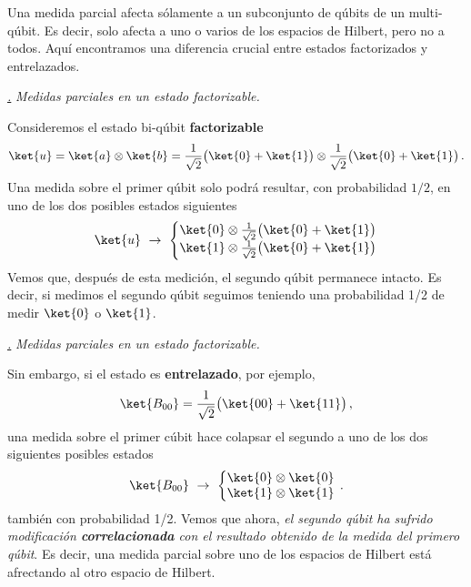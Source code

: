 \documentclass[a4paper,11pt]{book} %
\numberwithin{equation}{chapter}
\def\subsubiContadorIt{\par\addtocounter{subsubsection}{1}\underline{\it\thesubsubsection.}\hskip0.5cm \setcounter{subsubsubsectionIt}{0}}
\newcommand{\SubsubiIt}[1]{
		\subsubiContadorIt \textit{#1}
	}
\newcounter{subsubsubsectionIt}[subsubsection]
\begin{document}
Una medida parcial afecta sólamente a un subconjunto de qúbits de un multi-qúbit. Es decir, solo afecta a uno o varios de los espacios de Hilbert, pero no a todos. Aquí encontramos una diferencia crucial entre estados factorizados y entrelazados. 		
		
			\SubsubiIt{Medidas parciales en un estado factorizable.}
			 


Consideremos el estado bi-qúbit \textbf{factorizable} 
\begin{equation}
\ket{u} = \ket{a}\otimes \ket{b} = \frac{1}{\sqrt{2}}\big( \ket{0} + \ket{1}\big)\otimes \frac{1}{\sqrt{2}}\big( \ket{0} + \ket{1}\big)\, .
\end{equation}
Una medida sobre el primer qúbit solo podrá resultar, con probabilidad $1/2$, en uno de los dos posibles estados siguientes  
\begin{equation}
\ket{u} ~\rightarrow ~ \left\{ \begin{matrix}\ket{0} \otimes \frac{1}{\sqrt{2}}\big( \ket{0} + \ket{1}\big)\\ \ket{1} \otimes \frac{1}{\sqrt{2}}\big( \ket{0} + \ket{1}\big) \end{matrix} \right.
\end{equation}
Vemos que, después de esta medición, el segundo qúbit permanece intacto. Es decir, si medimos el segundo qúbit seguimos teniendo una probabilidad 1/2 de medir $\ket{0}$ o $\ket{1}$.

			\SubsubiIt{Medidas parciales en un estado factorizable.}

Sin embargo, si el estado es \textbf{entrelazado}, por ejemplo, 
\begin{equation}
  \ket{B_{00}} = \frac{1}{\sqrt{2}}\big( \ket{00} + \ket{11} \big)\, ,
\end{equation}
una medida sobre el primer cúbit hace colapsar el segundo a uno de los dos siguientes posibles estados
\begin{equation}
\ket{B_{00}} ~\rightarrow ~ \left\{ \begin{matrix}\ket{0}\otimes\ket{0}  \\ \ket{1}\otimes \ket{1}\end{matrix} \right. \, .
\end{equation}
también con probabilidad 1/2. Vemos que ahora, \textit{el segundo qúbit ha sufrido modificación  \textbf{correlacionada} con el resultado obtenido de la medida del primero qúbit}.  Es decir, una medida parcial sobre uno de los espacios de Hilbert está afrectando al otro espacio de Hilbert. 
\end{document}
